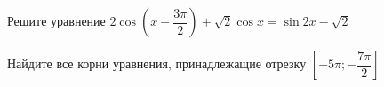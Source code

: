 \begin{ex}
	\begin{condition}
		\begin{enumcols}[label=\asbuk*)]
			\item Решите уравнение \( 2\cos {\left(x - \dfrac{3\pi}{2}\right)}+\sqrt{2}\cos x = \sin 2x - \sqrt{2} \)
			\item Найдите все корни уравнения, принадлежащие отрезку \( \left[-5\pi;-\dfrac{7\pi}{2}\right] \)
		\end{enumcols}
	\end{condition}
\end{ex}
